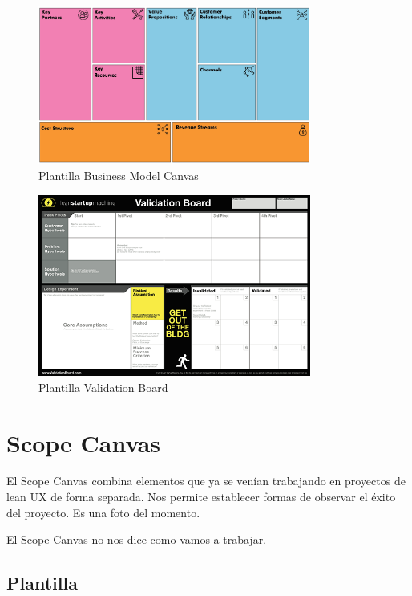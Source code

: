 \documentclass[titlepage,a4paper]{article}
\begin{document}
\begin{figure}[!htb]
    \centering
    \includegraphics[width=0.8\textwidth]{Imagenes/BusinessModelCanvas.jpg}
    \caption{Plantilla Business Model Canvas}
\end{figure}

\begin{figure}[!htb]
    \centering
    \includegraphics[width=0.8\textwidth]{Imagenes/ValidationBoard.png}
    \caption{Plantilla Validation Board}
\end{figure}

\newpage

\section{Scope Canvas}\label{sec:ScopeCanvas}

El Scope Canvas combina elementos que ya se venían trabajando en proyectos de lean UX de forma separada. Nos permite establecer formas de observar el éxito del proyecto. Es una foto del momento.


El Scope Canvas no nos dice como vamos a trabajar.

\subsection{Plantilla}
\end{document}
